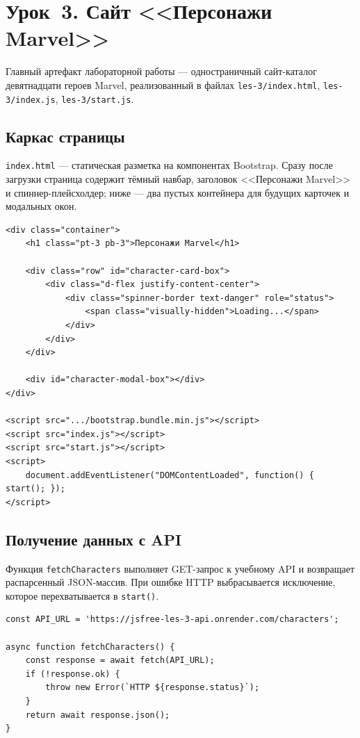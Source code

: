 \section{Урок~3. Сайт <<Персонажи Marvel>>}

Главный артефакт лабораторной работы --- одностраничный сайт-каталог
девятнадцати героев Marvel, реализованный в файлах
\texttt{les-3/index.html}, \texttt{les-3/index.js},
\texttt{les-3/start.js}.

\subsection{Каркас страницы}

\texttt{index.html} --- статическая разметка на компонентах Bootstrap.
Сразу после загрузки страница содержит тёмный навбар, заголовок
<<Персонажи Marvel>> и спиннер-плейсхолдер; ниже --- два пустых
контейнера для будущих карточек и модальных окон.

\begin{lstlisting}[caption={Ключевая часть \texttt{les-3/index.html}},captionpos=b]
<div class="container">
    <h1 class="pt-3 pb-3">Персонажи Marvel</h1>

    <div class="row" id="character-card-box">
        <div class="d-flex justify-content-center">
            <div class="spinner-border text-danger" role="status">
                <span class="visually-hidden">Loading...</span>
            </div>
        </div>
    </div>

    <div id="character-modal-box"></div>
</div>

<script src=".../bootstrap.bundle.min.js"></script>
<script src="index.js"></script>
<script src="start.js"></script>
<script>
    document.addEventListener("DOMContentLoaded", function() { start(); });
</script>
\end{lstlisting}

\subsection{Получение данных с API}

Функция \texttt{fetchCharacters} выполняет GET-запрос к учебному
API и возвращает распарсенный JSON-массив. При ошибке HTTP
выбрасывается исключение, которое перехватывается в \texttt{start()}.

\begin{lstlisting}[caption={\texttt{les-3/index.js} --- запрос к API},captionpos=b]
const API_URL = 'https://jsfree-les-3-api.onrender.com/characters';

async function fetchCharacters() {
    const response = await fetch(API_URL);
    if (!response.ok) {
        throw new Error(`HTTP ${response.status}`);
    }
    return await response.json();
}
\end{lstlisting}

